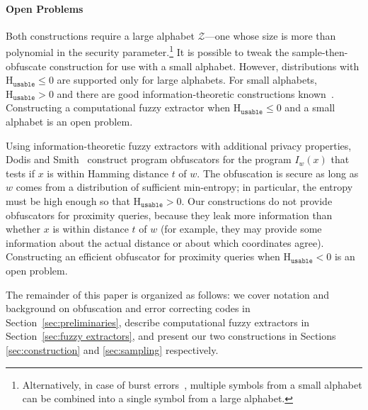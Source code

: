 \documentclass[11pt]{article}
\newcommand{\secref}[1]{\mbox{Section~\ref{#1}}}
\newcommand{\Huse}{\mathrm{H}_{\mathtt{usable}}}
\begin{document}
\paragraph{Open Problems}
Both constructions require a large alphabet $\mathcal{Z}$---one whose size is more than polynomial in the security parameter.\footnote{Alternatively, in case of burst errors~\cite{gilbert1960capacity}, multiple symbols from a small alphabet can be combined into a single symbol from a large alphabet.}  It is possible to tweak the sample-then-obfuscate construction for use with a small alphabet.  However, distributions with $\Huse \le 0$ are supported only for large alphabets.  For small alphabets, $\Huse>0$ and there are good information-theoretic constructions known~\cite[Section 5]{DBLP:journals/siamcomp/DodisORS08}.
Constructing a computational fuzzy extractor when $\Huse\le 0$ and a small alphabet is an open problem.

Using information-theoretic fuzzy extractors with additional privacy properties, Dodis and Smith~\cite[Section 5]{DBLP:conf/stoc/DodisS05} construct program obfuscators for the program $I_w(x)$ that tests if $x$ is within Hamming distance $t$ of $w$. The obfuscation is secure as long as $w$ comes from a distribution of sufficient min-entropy; in particular, the entropy must be high enough so that $\Huse>0$. Our constructions do not provide obfuscators for proximity queries, because they leak more information than whether $x$ is within distance $t$ of $w$ (for example, they may provide some information about the actual distance or about which coordinates agree). Constructing an efficient obfuscator for proximity queries when $\Huse<0$ is an open problem.

\medskip
The remainder of this paper is organized as follows: we cover notation and background on obfuscation and error correcting codes in \secref{sec:preliminaries}, describe computational fuzzy extractors in \secref{sec:fuzzy extractors}, and present our two constructions in Sections \ref{sec:construction} and \ref{sec:sampling} respectively.
\end{document}
